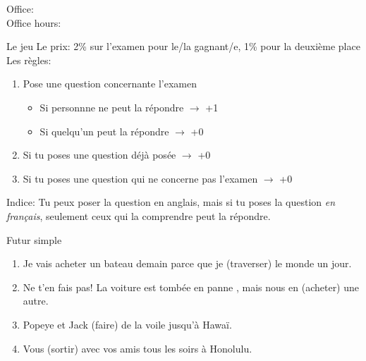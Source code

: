\documentclass{beamer}
\subtitle[Révision, examen 2]{Révision de l'examen 2 (Ch 8 \& 9)}
\begin{document}
  \begin{frame}
    \titlepage
    \tiny{Office: \\
          Office hours: }
  \end{frame}

  \begin{frame}{Le jeu}
    \alert{Le prix:} 2\% sur l'examen pour le/la gagnant/e, 1\% pour la deuxième place \\
    \vspace{0.25cm}
    \alert{Les règles:}
    \begin{enumerate}
      \item Pose une question concernante l'examen
      \begin{itemize}
        \item Si personnne ne peut la répondre $\to$ +1
        \item Si quelqu'un peut la répondre $\to$ +0
      \end{itemize}
      \item Si tu poses une question déjà posée $\to$ +0
      \item Si tu poses une question qui ne concerne pas l'examen $\to$ +0
    \end{enumerate}
    \vspace{0.25cm}
    \alert{Indice:} Tu peux poser la question en anglais, mais si tu poses la question \emph{en français}, seulement ceux qui la comprendre peut la répondre.
  \end{frame}

  \begin{frame}{Futur simple}
    \begin{enumerate}
      \item Je vais acheter un bateau demain parce que je \underline{} (traverser) le monde un jour.
      \item Ne t'en fais pas! La voiture est tombée en panne , mais nous en \underline{} (acheter) une autre.
      \item Popeye et Jack \underline{} (faire) de la voile jusqu'à Hawaï.
      \item Vous \underline{} (sortir) avec vos amis tous les soirs à Honolulu.
    \end{enumerate}
  \end{frame}
\end{document}
